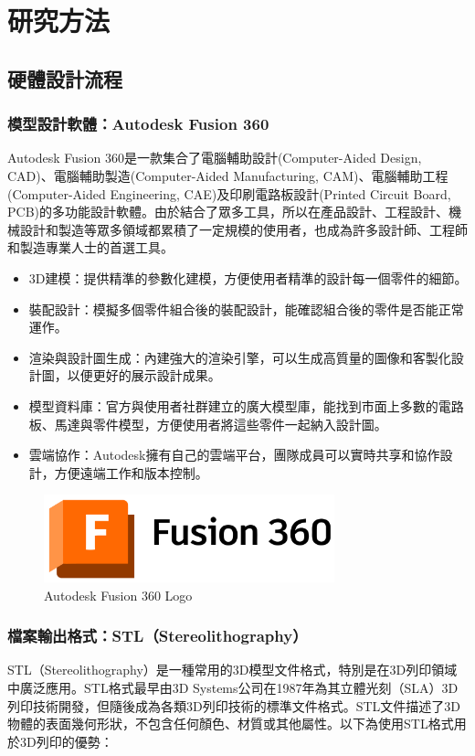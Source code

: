 \documentclass[class=NCU_thesis, crop=false]{standalone}
\begin{document}
\chapter{研究方法}
\section{硬體設計流程}
\subsection{模型設計軟體：Autodesk Fusion 360}
Autodesk Fusion 360是一款集合了電腦輔助設計(Computer-Aided Design, CAD)、電腦輔助製造(Computer-Aided Manufacturing, CAM)、電腦輔助工程(Computer-Aided Engineering, CAE)及印刷電路板設計(Printed Circuit Board, PCB)的多功能設計軟體。由於結合了眾多工具，所以在產品設計、工程設計、機械設計和製造等眾多領域都累積了一定規模的使用者，也成為許多設計師、工程師和製造專業人士的首選工具。

\begin{itemize}
    \item 3D建模：提供精準的參數化建模，方便使用者精準的設計每一個零件的細節。
    \item 裝配設計：模擬多個零件組合後的裝配設計，能確認組合後的零件是否能正常運作。
    \item 渲染與設計圖生成：內建強大的渲染引擎，可以生成高質量的圖像和客製化設計圖，以便更好的展示設計成果。
    \item 模型資料庫：官方與使用者社群建立的廣大模型庫，能找到市面上多數的電路板、馬達與零件模型，方便使用者將這些零件一起納入設計圖。
    \item 雲端協作：Autodesk擁有自己的雲端平台，團隊成員可以實時共享和協作設計，方便遠端工作和版本控制。
\end{itemize}

\begin{figure}[htbp]
    \centering
    \includegraphics[width=0.75\textwidth]{figures/autodesk-fusion-360-seeklogo.png}
\caption{Autodesk Fusion 360 Logo~\cite{autodesk_echo_dot}}
\end{figure}

\subsection{檔案輸出格式：STL（Stereolithography）}
STL（Stereolithography）是一種常用的3D模型文件格式，特別是在3D列印領域中廣泛應用。STL格式最早由3D Systems公司在1987年為其立體光刻（SLA）3D列印技術開發，但隨後成為各類3D列印技術的標準文件格式。STL文件描述了3D物體的表面幾何形狀，不包含任何顏色、材質或其他屬性。以下為使用STL格式用於3D列印的優勢：
\end{document}
